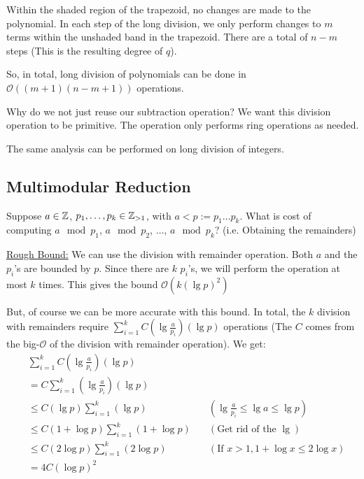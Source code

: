 Within the shaded region of the trapezoid, no changes are made to the polynomial.
In each step of the long division, we only perform changes to $m$ terms within the unshaded band in the trapezoid.
There are a total of $n-m$ steps (This is the resulting degree of $q$).

So, in total, long division of polynomials can be done in $\mathcal{O}((m+1)(n-m+1))$ operations.

\begin{note}
    Why do we not just reuse our subtraction operation? We want this division operation to be primitive. The operation only performs ring operations as needed.
\end{note}

The same analysis can be performed on long division of integers.

\subsection{Multimodular Reduction}
Suppose $a \in \mathbb{Z}$, $p_1, \ldots, p_k \in \mathbb{Z}_{> 1}$, with $a < p := p_1\ldots p_k$. What is cost of computing $a \mod p_1$, $a \mod p_2$, $\ldots$, $a \mod p_k$? (i.e. Obtaining the remainders)

\underline{Rough Bound:} We can use the division with remainder operation.
Both $a$ and the $p_i$'s are bounded by $p$.
Since there are $k$ $p_i$'s, we will perform the operation at most $k$ times.
This gives the bound $\mathcal{O}(k(\lg p)^2)$

But, of course we can be more accurate with this bound.
In total, the $k$ division with remainders require $\sum_{i = 1}^k C\left(\lg \frac{a}{p_i}\right)\left(\lg p\right)$ operations (The $C$ comes from the big-$\mathcal{O}$ of the division with remainder operation).
We get:
\begin{equation}
\begin{aligned}
    &\sum_{i = 1}^k C\left(\lg \frac{a}{p_i}\right)\left(\lg p\right)\\
    &= C \sum_{i = 1}^k \left(\lg \frac{a}{p_i}\right)\left(\lg p\right) \\
    &\leq C \left(\lg p\right) \sum_{i = 1}^k \left(\lg p\right) \quad &(\lg \frac{a}{p_i} \leq \lg a \leq \lg p) \\
    &\leq C (1 + \log p) \sum_{i = 1}^k (1 + \log p) \quad & (\text{Get rid of the }\lg)\\
    &\leq C (2\log p) \sum_{i = 1}^k (2\log p) \quad & (\text{If } x > 1, 1 + \log x \leq 2\log x)\\
    &=4C(\log p)^2
\end{aligned}
\end{equation}

\clearpage